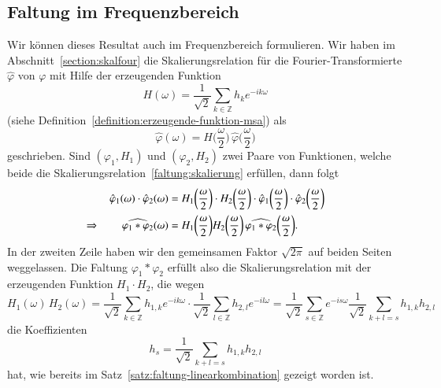 \subsection{Faltung im Frequenzbereich
\label{subsection:faltung-im-frequenzbereich}}
Wir können dieses Resultat auch im Frequenzbereich formulieren.
Wir haben im Abschnitt~\ref{section:skalfour} die Skalierungsrelation
für die Fourier-Transformierte $\hat{\varphi}$ von $\varphi$ mit Hilfe
der erzeugenden Funktion
\[
H(\omega)
=
\frac{1}{\sqrt{2}}
\sum_{k\in\mathbb Z} h_ke^{-ik\omega}
\]
(siehe Definition~\ref{definition:erzeugende-funktion-msa})
als
\begin{equation}
\hat{\varphi}(\omega)
=
H\biggl(\frac{\omega}2\biggr)
\,
\hat{\varphi}\biggl(\frac{\omega}2\biggr)
\label{faltung:skalierung}
\end{equation}
geschrieben.
Sind
$(\varphi_1,H_1)$ und $(\varphi_2,H_2)$ zwei Paare von Funktionen,
welche beide die Skalierungsrelation~\eqref{faltung:skalierung} erfüllen,
dann folgt
\begin{align*}
\hat{\varphi}_1(\omega)
\cdot
\hat{\varphi}_2(\omega)
&=
H_1\biggl(\frac{\omega}2\biggr)
\cdot
H_2\biggl(\frac{\omega}2\biggr)
\cdot
\hat{\varphi}_1\biggl(\frac{\omega}2\biggr)
\cdot
\hat{\varphi}_2\biggl(\frac{\omega}2\biggr)
\\
\Rightarrow\qquad
\widehat{\mathstrut\varphi_1*\varphi_2}(\omega)
&=
H_1\biggl(\frac{\omega}2\biggr)
H_2\biggl(\frac{\omega}2\biggr)
\,
\widehat{\mathstrut\varphi_1*\varphi_2}\biggl(\frac{\omega}2\biggr).
\end{align*}
In der zweiten Zeile haben wir den gemeinsamen Faktor $\sqrt{2\pi}$
auf beiden Seiten weggelassen.
Die Faltung $\varphi_1*\varphi_2$ erfüllt also die Skalierungsrelation
mit der erzeugenden Funktion $H_1\cdot H_2$, die wegen
\[
H_1(\omega)\,H_2(\omega)
=
\frac{1}{\sqrt{2}}
\sum_{k\in\mathbb Z} h_{1,k}e^{-ik\omega}
\cdot
\frac{1}{\sqrt{2}}
\sum_{l\in\mathbb Z} h_{2,l}e^{-il\omega}
=
\frac{1}{\sqrt{2}}
\sum_{s\in\mathbb Z} e^{-is\omega}
\frac{1}{\sqrt{2}}
\sum_{k+l=s}h_{1,k}h_{2,l}
\]
die Koeffizienten
\[
h_s = \frac{1}{\sqrt{2}}\sum_{k+l=s} h_{1,k}h_{2,l}
\]
hat,
wie bereits im Satz~\ref{satz:faltung-linearkombination} gezeigt worden ist.

